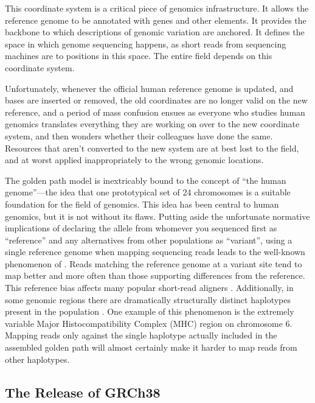 This coordinate system is a critical piece of genomics infrastructure. It allows the reference genome to be annotated with genes and other elements. It provides the backbone to which descriptions of genomic variation are anchored. It defines the space in which genome sequencing happens, as short reads from sequencing machines are  to positions in this space. The entire field depends on this coordinate system.

Unfortunately, whenever the official human reference genome is updated, and bases are inserted or removed, the old coordinates are no longer valid on the new reference, and a period of mass confusion ensues as everyone who studies human genomics translates everything they are working on over to the new coordinate system, and then wonders whether their colleagues have done the same. Resources that aren't converted to the new system are at best lost to the field, and at worst applied inappropriately to the wrong genomic locations.

The golden path model is inextricably bound to the concept of ``the human genome''---the idea that one prototypical set of 24 chromosomes is a suitable foundation for the field of genomics. This idea has been central to human genomics, but it is not without its flaws. Putting aside the unfortunate normative implications of declaring the allele from whomever you sequenced first as ``reference'' and any alternatives from other populations as ``variant'', using a single reference genome when mapping sequencing reads leads to the well-known phenomenon of . Reads matching the reference genome at a variant site tend to map better and more often than those supporting differences from the reference. This reference bias affects many popular short-read aligners \cite{lunter2011stampy}. Additionally, in some genomic regions there are dramatically structurally distinct haplotypes present in the population \cite{church2011modernizing}. One example of this phenomenon is the extremely variable Major Histocompatibility Complex (MHC) region on chromosome 6. Mapping reads only against the single haplotype actually included in the assembled golden path will almost certainly make it harder to map reads from other haplotypes.

\subsection{The Release of GRCh38}

